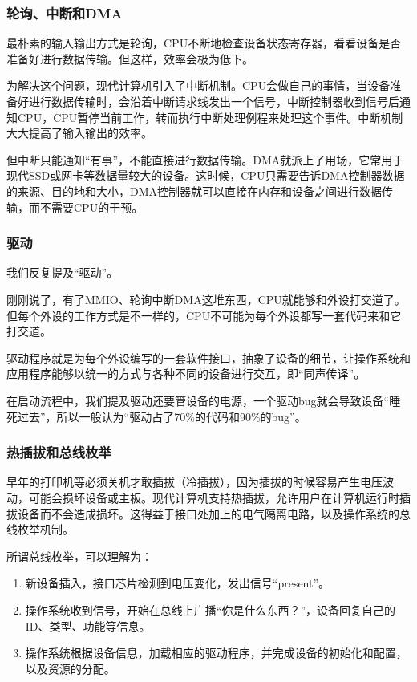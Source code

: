 \documentclass[fontset=none,aspectratio=1610]{ctexbeamer}
\begin{document}
\begin{frame}
    \frametitle{轮询、中断和DMA}

    最朴素的输入输出方式是轮询，CPU不断地检查设备状态寄存器，看看设备是否准备好进行数据传输。但这样，效率会极为低下。

    为解决这个问题，现代计算机引入了中断机制。CPU会做自己的事情，当设备准备好进行数据传输时，会沿着中断请求线发出一个信号，中断控制器收到信号后通知CPU，CPU暂停当前工作，转而执行中断处理例程来处理这个事件。中断机制大大提高了输入输出的效率。

    但中断只能通知“有事”，不能直接进行数据传输。DMA就派上了用场，它常用于现代SSD或网卡等数据量较大的设备。这时候，CPU只需要告诉DMA控制器数据的来源、目的地和大小，DMA控制器就可以直接在内存和设备之间进行数据传输，而不需要CPU的干预。

\end{frame}

\begin{frame}
    \frametitle{驱动}

    我们反复提及“驱动”。

    刚刚说了，有了MMIO、轮询中断DMA这堆东西，CPU就能够和外设打交道了。但每个外设的工作方式是不一样的，CPU不可能为每个外设都写一套代码来和它打交道。
    
    驱动程序就是为每个外设编写的一套软件接口，抽象了设备的细节，让操作系统和应用程序能够以统一的方式与各种不同的设备进行交互，即“同声传译”。

    在启动流程中，我们提及驱动还要管设备的电源，一个驱动bug就会导致设备“睡死过去”，所以一般认为“驱动占了70\%的代码和90\%的bug”。

\end{frame}

\begin{frame}
    \frametitle{热插拔和总线枚举}

    早年的打印机等必须关机才敢插拔（冷插拔），因为插拔的时候容易产生电压波动，可能会损坏设备或主板。现代计算机支持热插拔，允许用户在计算机运行时插拔设备而不会造成损坏。这得益于接口处加上的电气隔离电路，以及操作系统的总线枚举机制。

    所谓总线枚举，可以理解为：
    \begin{enumerate}
        \item 新设备插入，接口芯片检测到电压变化，发出信号“present”。
        \item 操作系统收到信号，开始在总线上广播“你是什么东西？”，设备回复自己的ID、类型、功能等信息。
        \item 操作系统根据设备信息，加载相应的驱动程序，并完成设备的初始化和配置，以及资源的分配。
    \end{enumerate}

\end{frame}
\end{document}
